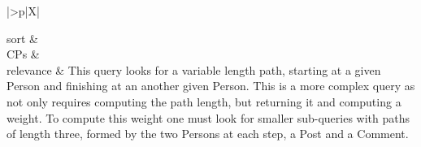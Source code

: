 \begin{tabularx}{\queryCardWidth}{|>{\queryPropertyCell}p{\queryPropertyCellWidth}|X|}
%
	
		sort		&
		\innerCardVSpace \\ \hline
	CPs &
	 \\ \hline
	relevance &
		\footnotesize This query looks for a variable length path, starting at a given Person and finishing at an another given Person. This
is a more complex query as not only requires computing the path length, but returning it and computing a weight.
To compute this weight one must look for smaller sub-queries with paths of length three, formed by the two Persons
at each step, a Post and a Comment.
 \\ \hline%
\end{tabularx}
\queryCardVSpace

\let\emph\oldemph